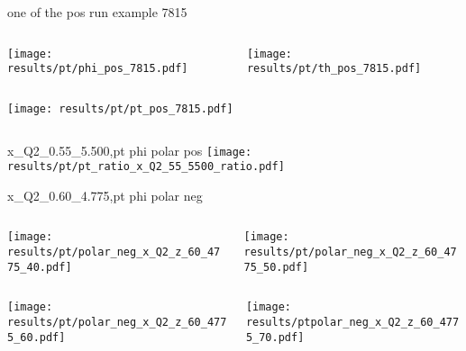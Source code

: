\begin{frame}{one of the pos run example 7815}
\begin{columns}
\begin{column}[T]{0.5\textwidth}
\texttt{[image: results/pt/phi\_pos\_7815.pdf]}
\end{column}
\begin{column}[T]{0.5\textwidth}
\texttt{[image: results/pt/th\_pos\_7815.pdf]}
\end{column}
\end{columns}
\begin{columns}
\begin{column}[T]{0.5\textwidth}
\texttt{[image: results/pt/pt\_pos\_7815.pdf]}
\end{column}
\begin{column}[T]{0.5\textwidth}
\end{column}
\end{columns}
\end{frame}
\begin{frame}{x\_Q2\_0.55\_5.500,pt phi polar pos}
\texttt{[image: results/pt/pt\_ratio\_x\_Q2\_55\_5500\_ratio.pdf]}
\end{frame}
\begin{frame}{x\_Q2\_0.60\_4.775,pt phi polar neg}
\begin{columns}
\begin{column}[T]{0.5\textwidth}
\texttt{[image: results/pt/polar\_neg\_x\_Q2\_z\_60\_4775\_40.pdf]}
\end{column}
\begin{column}[T]{0.5\textwidth}
\texttt{[image: results/pt/polar\_neg\_x\_Q2\_z\_60\_4775\_50.pdf]}
\end{column}
\end{columns}
\begin{columns}
\begin{column}[T]{0.5\textwidth}
\texttt{[image: results/pt/polar\_neg\_x\_Q2\_z\_60\_4775\_60.pdf]}
\end{column}
\begin{column}[T]{0.5\textwidth}
\texttt{[image: results/ptpolar\_neg\_x\_Q2\_z\_60\_4775\_70.pdf]}
\end{column}
\end{columns}
\end{frame}
